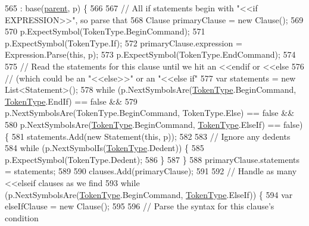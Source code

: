 \begin{DoxyCode}
565                                                              : base(\hyperlink{a00150_af313a82103fcc2ff5a177dbb06b92f7b}{parent}, p) \{
566 
567                 \textcolor{comment}{// All if statements begin with "<<if EXPRESSION>>", so parse that}
568                 Clause primaryClause = \textcolor{keyword}{new} Clause();
569 
570                 p.ExpectSymbol(TokenType.BeginCommand);
571                 p.ExpectSymbol(TokenType.If);
572                 primaryClause.expression = Expression.Parse(\textcolor{keyword}{this}, p);
573                 p.ExpectSymbol(TokenType.EndCommand);
574 
575                 \textcolor{comment}{// Read the statements for this clause until  we hit an <<endif or <<else}
576                 \textcolor{comment}{// (which could be an "<<else>>" or an "<<else if"}
577                 var statements = \textcolor{keyword}{new} List<Statement>();
578                 \textcolor{keywordflow}{while} (p.NextSymbolsAre(\hyperlink{a00053_a301aa7c866593a5b625a8fc158bbeace}{TokenType}.BeginCommand, 
      \hyperlink{a00053_a301aa7c866593a5b625a8fc158bbeace}{TokenType}.EndIf) == \textcolor{keyword}{false} &&
579                     p.NextSymbolsAre(TokenType.BeginCommand, TokenType.Else) == \textcolor{keyword}{false} &&
580                     p.NextSymbolsAre(\hyperlink{a00053_a301aa7c866593a5b625a8fc158bbeace}{TokenType}.BeginCommand, \hyperlink{a00053_a301aa7c866593a5b625a8fc158bbeace}{TokenType}.ElseIf) == \textcolor{keyword}{false}) 
      \{
581                     statements.Add(\textcolor{keyword}{new} Statement(\textcolor{keyword}{this}, p));
582 
583                     \textcolor{comment}{// Ignore any dedents}
584                     \textcolor{keywordflow}{while} (p.NextSymbolIs(\hyperlink{a00053_a301aa7c866593a5b625a8fc158bbeace}{TokenType}.Dedent)) \{
585                         p.ExpectSymbol(TokenType.Dedent);
586                     \}
587                 \}
588                 primaryClause.statements = statements;
589 
590                 clauses.Add(primaryClause);
591 
592                 \textcolor{comment}{// Handle as many <<elseif clauses as we find}
593                 \textcolor{keywordflow}{while} (p.NextSymbolsAre(\hyperlink{a00053_a301aa7c866593a5b625a8fc158bbeace}{TokenType}.BeginCommand, 
      \hyperlink{a00053_a301aa7c866593a5b625a8fc158bbeace}{TokenType}.ElseIf)) \{
594                     var elseIfClause = \textcolor{keyword}{new} Clause();
595 
596                     \textcolor{comment}{// Parse the syntax for this clause's condition}

\end{DoxyCode}
